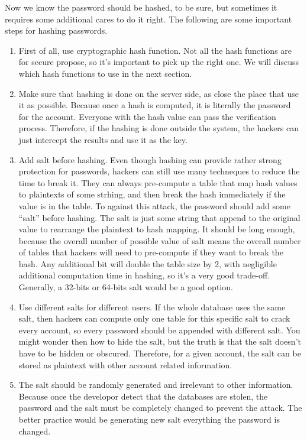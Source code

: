 \documentclass[conference]{IEEEtran}
\begin{document}
Now we know the password should be hashed, to be sure, but sometimes
it requires some additional cares to do it right. The following are
some important steps for hashing passwords.

\begin{enumerate}[label=\textbf{\arabic*.}]
    \item
First of all, use cryptographic hash function. Not all the hash functions
are for secure propose, so it's important to pick up the right one.
We will discuss 
which hash functions to use in the next section.

    \item
Make sure that hashing is done on the server side,
as close the place that use it as possible.
Because
once a hash is computed, it is literally the password for the account.
Everyone with the hash value can pass the verification process. Therefore,
if the hashing is done outside the system, the hackers can just intercept the results
and use it as the key.

    \item
Add salt before hashing.
Even though hashing can provide rather strong protection for passwords,
hackers can still use many techneques to reduce the time to break it.
They can always pre-compute a table \cite{rainbow} that map
hash values to plaintexts of some strhing, and then
break the hash immediately if the value is in the table.
To against this attack, the password should add some
``salt'' \cite{salt} before hashing.
The salt is just some string that append to the original value to
rearrange the plaintext to hash mapping.
It should be long enough, because the overall number of
possible value of salt means the overall number of tables that
hackers will need to pre-compute if they want to break the hash.
Any additional bit will double the table size by 2, with
negligible additional computation time in hashing, so it's
a very good trade-off.
Generally, a 32-bits or 64-bits salt would be a good option.

    \item
Use different salts for different users.
If the whole database uses the same salt, then hackers
can compute only one table for this specific salt to crack
every account, so every password should be appended with
different salt.
You might wonder then how to hide the salt,
but the truth is that the salt
doesn't have to be hidden or obscured.
Therefore, for a given account, the salt can be stored as plaintext
with other account related information.

    \item
The salt should be randomly generated and irrelevant to other
information. Because once the developor detect that the databases
are stolen, the password and the salt must be completely changed to
prevent the attack. The better practice would be generating new salt
everything the password is changed.
\end{enumerate}
\end{document}
